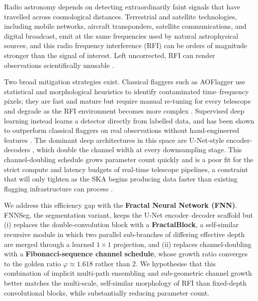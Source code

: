 \documentclass[11pt]{article}
\begin{document}
Radio astronomy depends on detecting extraordinarily faint signals that have travelled across cosmological distances. Terrestrial and satellite technologies, including mobile networks, aircraft transponders, satellite communications, and digital broadcast, emit at the same frequencies used by natural astrophysical sources, and this radio frequency interference (RFI) can be orders of magnitude stronger than the signal of interest. Left uncorrected, RFI can render observations scientifically unusable \citep{baan2004}.

Two broad mitigation strategies exist. Classical flaggers such as AOFlagger \citep{offringa2012} use statistical and morphological heuristics to identify contaminated time--frequency pixels; they are fast and mature but require manual re-tuning for every telescope and degrade as the RFI environment becomes more complex \citep{offringa2010}. Supervised deep learning instead learns a detector directly from labelled data, and has been shown to outperform classical flaggers on real observations without hand-engineered features \citep{vafaeisadr2020,gu2024}. The dominant deep architectures in this space are U-Net-style encoder-decoders \citep{ronneberger2015,dutoit2023}, which double the channel width at every downsampling stage. This channel-doubling schedule grows parameter count quickly and is a poor fit for the strict compute and latency budgets of real-time telescope pipelines, a constraint that will only tighten as the SKA begins producing data faster than existing flagging infrastructure can process \citep{sclocco2020}.

We address this efficiency gap with the \textbf{Fractal Neural Network (FNN)}. FNNSeg, the segmentation variant, keeps the U-Net encoder--decoder scaffold but (i) replaces the double-convolution block with a \textbf{FractalBlock}, a self-similar recursive module in which two parallel sub-branches of differing effective depth are merged through a learned $1\times1$ projection, and (ii) replaces channel-doubling with a \textbf{Fibonacci-sequence channel schedule}, whose growth ratio converges to the golden ratio $\varphi \approx 1.618$ rather than 2. We hypothesise that this combination of implicit multi-path ensembling and sub-geometric channel growth better matches the multi-scale, self-similar morphology of RFI than fixed-depth convolutional blocks, while substantially reducing parameter count.
\end{document}

